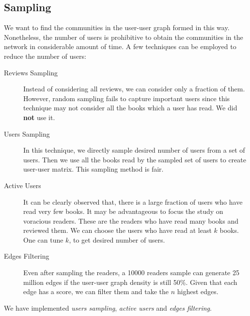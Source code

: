 \documentclass[11pt]{article}
\begin{document}
\subsection{Sampling}
We want to find the communities in the user-user graph formed in this way. Nonetheless, the number of users is prohibitive to obtain the communities in the network in considerable amount of time. A few techniques can be employed to reduce the number of users:
\begin{description}
	\item[Reviews Sampling] Instead of considering all reviews, we can consider only a fraction of them. However, random sampling fails to capture important users since this technique may not consider all the books which a user has read. We did \textbf{not} use it.
    \item[Users Sampling] In this technique, we directly sample desired number of users from a set of users. Then we use all the books read by the sampled set of users to create user-user matrix. This sampling method is fair.
    \item[Active Users] It can be clearly observed that, there is a large fraction of users who have read very few books. It may be advantageous to focus the study on voracious readers. These are the readers who have read many books and reviewed them. We can choose the users who have read at least $k$ books. One can tune $k$, to get desired number of users.
    \item[Edges Filtering] Even after sampling the readers, a 10000 readers sample can generate 25 million edges if the user-user graph density is still 50\%. Given that each edge has a score, we can filter them and take the $n$ highest edges.

\end{description}
We have implemented {\it users sampling}, {\it active users} and {\it edges filtering}.
\end{document}

